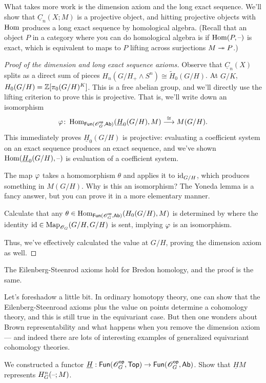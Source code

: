 What takes more work is the dimension axiom and the long exact sequence. We'll show that $\underline C_n(X;M)$ is a
projective object, and hitting projective objects with $\operatorname{Hom}$ produces a long exact sequence by homological
algebra. (Recall that an object $P$ in a category where you can do homological algebra is  if
$\operatorname{Hom}(P,\text{--})$ is exact, which is equivalent to maps to $P$ lifting across surjections $M\twoheadrightarrow P$.)
\begin{proof}[Proof of the dimension and long exact sequence axioms]
Observe that $\underline C_n(X)$ splits as a direct sum of pieces $H_n(G/H_+\wedge S^n)\cong \widetilde H_0(G/H)$.
At $G/K$, $H_0(G/H) = \mathbb Z[\pi_0(G/H)^K]$. This is a free abelian group, and we'll directly use the lifting criterion
to prove this is projective. That is, we'll write down an isomorphism
\[\varphi\colon\operatorname{Hom}_{\mathsf{Fun}(\mathscr O_G^{\mathsf{op}}, \mathsf{Ab})}(\underline H_0(G/H), M)\stackrel\cong\longrightarrow M(G/H).\]
This immediately proves $\underline H_0(G/H)$ is projective: evaluating a coefficient system on an exact sequence
produces an exact sequence, and we've shown $\operatorname{Hom}(\underline H_0(G/H), \text{--})$ is evaluation of a coefficient system.

The map $\varphi$ takes a homomorphism $\theta$ and applies it to $\mathrm{id}_{G/H}$, which produces something in $M(G/H)$.
Why is this an isomorphism? The Yoneda lemma is a fancy answer, but you can prove it in a more elementary manner.
\begin{ex}
Calculate that any $\theta\in\operatorname{Hom}_{\mathsf{Fun}(\mathscr O_G^{\mathsf{op}}, \mathsf{Ab})}(H_0(G/H), M)$ is determined by where the identity
$\mathrm{id}\in\operatorname{Map}_{\mathscr O_G}(G/H, G/H)$ is sent, implying $\varphi$ is an isomorphism.
\end{ex}
Thus, we've effectively calculated the value at $G/H$, proving the dimension axiom as well.
\end{proof}
The Eilenberg-Steenrod axioms hold for Bredon homology, and the proof is the same.
\begin{rem}
Let's foreshadow a little bit. In ordinary homotopy theory, one can show that the Eilenberg-Steenroad axioms
plus the value on points determine a cohomology theory, and this is still true in the equivariant case. But then
one wonders about Brown representability and what happens when you remove the dimension axiom --- and indeed
there are lots of interesting examples of generalized equivariant cohomology theories.
\end{rem}
\begin{ex}
We constructed a functor $\underline H:\mathsf{Fun}(\mathscr O_G^{\mathsf{op}},\mathsf{Top})\to \mathsf{Fun}(\mathscr O_G^{\mathsf{op}}, \mathsf{Ab})$. Show that $\underline HM$
represents $H_G^n(\text{--}; M)$.
\end{ex}
